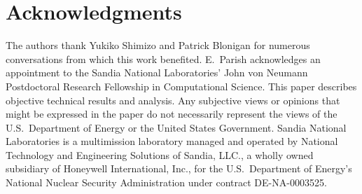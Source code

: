 \documentclass[3p,computermodern,10pt]{elsarticle}
\begin{document}
\section{Acknowledgments}
The authors thank Yukiko Shimizo and Patrick Blonigan for numerous conversations from which this work benefited. 
E.\ Parish acknowledges an appointment to the Sandia National Laboratories'
John von Neumann Postdoctoral Research Fellowship in Computational Science. This paper
describes objective technical results and analysis. Any subjective views or
opinions that might be expressed in the paper do not necessarily represent the
views of the U.S.\ Department of Energy or the United States Government.
Sandia National Laboratories is a multimission laboratory managed and operated
by National Technology and Engineering Solutions of Sandia, LLC., a wholly
owned subsidiary of Honeywell International, Inc., for the U.S.\  Department of
Energy's National Nuclear Security Administration under contract
DE-NA-0003525.
\end{document}
